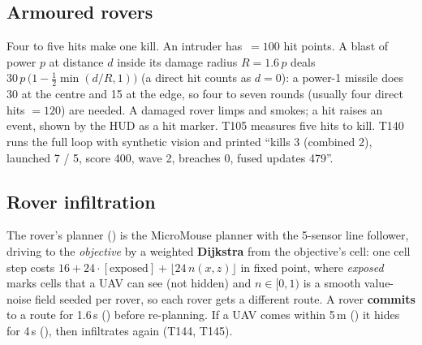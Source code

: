 \subsection{Armoured rovers}
Four to five hits make one kill. An intruder has \,$=100$ hit points. A blast of power $p$ at distance $d$ inside its damage radius $R=1.6\,p$ deals
$30\,p\,\bigl(1-\tfrac12\min(d/R,1)\bigr)$ (a direct hit counts as $d=0$): a power-1 missile does 30 at the centre and 15 at the edge, so four to seven rounds (usually four direct hits $=120$) are needed. A damaged rover limps and smokes; a hit raises an  event, shown by the HUD as a hit marker. T105 measures five hits to kill. T140 runs the full loop with synthetic vision and printed ``kills 3 (combined 2), launched 7 / 5, score 400, wave 2, breaches 0, fused updates 479''.

\subsection{Rover infiltration}
The rover's planner () is the MicroMouse planner with the 5-sensor line follower, driving to the \emph{objective} by a weighted \textbf{Dijkstra} from the objective's cell: one cell step costs $16+24\cdot[\text{exposed}]+\lfloor24\,n(x,z)\rfloor$ in fixed point, where \emph{exposed} marks cells that a UAV can see (not hidden) and $n\in[0,1)$ is a smooth value-noise field seeded per rover, so each rover
gets a different route. A rover \textbf{commits} to a route for 1.6\,s () before re-planning. If a UAV comes within 5\,m
() it hides for 4\,s (), then infiltrates again (T144, T145).
